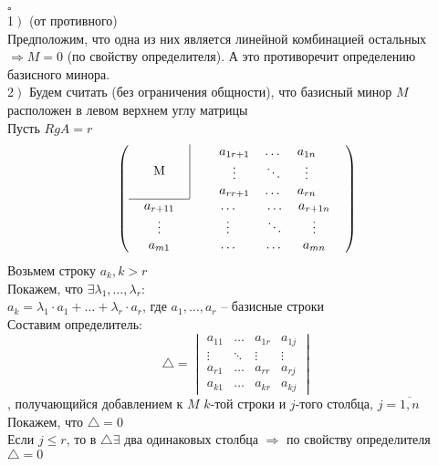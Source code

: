 \documentclass[a4paper,12pt]{article}
\begin{document}
$\square$\\
1$\left.\right)$ (от противного)\\
Предположим, что одна из них является линейной комбинацией остальных $\Rightarrow M=0$ (по свойству определителя). А это противоречит определению базисного минора.\\
2$\left.\right)$ Будем считать (без ограничения общности), что базисный минор $M$ расположен в левом верхнем углу матрицы\\
Пусть $RgA=r$
\[\left( \begin{tabular}{c|c}
M & \begin{tabular}{ccc}
$a_{1r+1}$&\ldots&$a_{1n}$\\
$\vdots$&$\ddots$&$\vdots$\\
$a_{rr+1}$&\ldots&$a_{rn}$
\end{tabular} \\ \cline{1-1}
\multicolumn{1}{c}{\begin{tabular}{c}
	$a_{r+11}$\\
	$\vdots$\\
	$a_{m1}$
	\end{tabular}} & \multicolumn{1}{c}{\begin{tabular}{ccccc}
	&$\ldots$&&$\ldots$&$a_{r+1n}$\\
	&$\vdots$&&$\ddots$&$\vdots$\\
	&$\ldots$&&\ldots&$a_{mn}$
	\end{tabular}} \\ 
\end{tabular}
\right) \]
Возьмем строку $a_k, k>r$\\
Покажем, что $\exists \lambda_1, \ldots, \lambda_r$:\\
$a_k=\lambda_1\cdot a_1+\ldots+\lambda_r\cdot a_r$, где $a_1, \ldots, a_r$ -- базисные строки\\
Составим определитель:
\[
\triangle=\begin{vmatrix}
a_{11}&\ldots&a_{1r}&a_{1j}\\
\vdots&\ddots&\vdots&\vdots\\
a_{r1}&\ldots&a_{rr}&a_{rj}\\
a_{k1}&\ldots&a_{kr}&a_{kj}
\end{vmatrix}
\]
, получающийся добавлением к $M$ $k$-той строки и $j$-того столбца, $j=\overline{1, n}$\\
Покажем, что $\triangle=0$\\
Если $j\leq r$, то в $\triangle \exists$ два одинаковых столбца $\Rightarrow$ по свойству определителя $\triangle=0$\\
\end{document}

